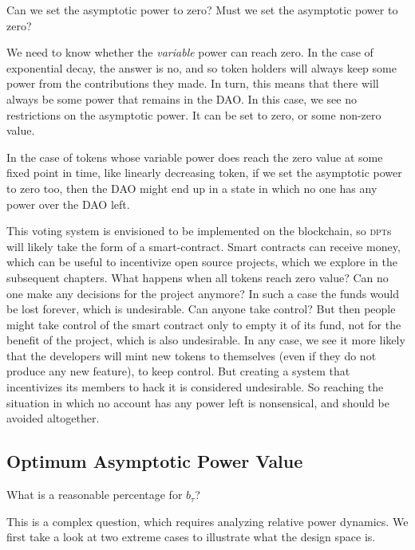 Can we set the asymptotic power to zero?
Must we set the asymptotic power to zero?

We need to know whether the \emph{variable} power can reach zero.
In the case of exponential decay, the answer is no, and so token holders will always keep some power from the contributions they made.
In turn, this means that there will always be some power that remains in the DAO.
In this case, we see no restrictions on the asymptotic power.
It can be set to zero, or some non-zero value.

In the case of tokens whose variable power does reach the zero value at some fixed point in time, like linearly decreasing token, if we set the asymptotic power to zero too, then the DAO might end up in a state in which no one has any power over the DAO left.

This voting system is envisioned to be implemented on the blockchain, so \textsc{dpt}s will likely take the form of a smart-contract.
Smart contracts can receive money, which can be useful to incentivize open source projects, which we explore in the subsequent chapters.
What happens when all tokens reach zero value?
Can no one make any decisions for the project anymore?
In such a case the funds would be lost forever, which is undesirable.
Can anyone take control?
But then people might take control of the smart contract only to empty it of its fund, not for the benefit of the project, which is also undesirable.
In any case, we see it more likely that the developers will mint new tokens to themselves (even if they do not produce any new feature), to keep control.
But creating a system that incentivizes its members to hack it is considered undesirable.
So reaching the situation in which no account has any power left is nonsensical, and should be avoided altogether.

\subsection{Optimum Asymptotic Power Value}

What is a reasonable percentage for $b_\tau$?

This is a complex question, which requires analyzing relative power dynamics.
We first take a look at two extreme cases to illustrate what the design space is.


